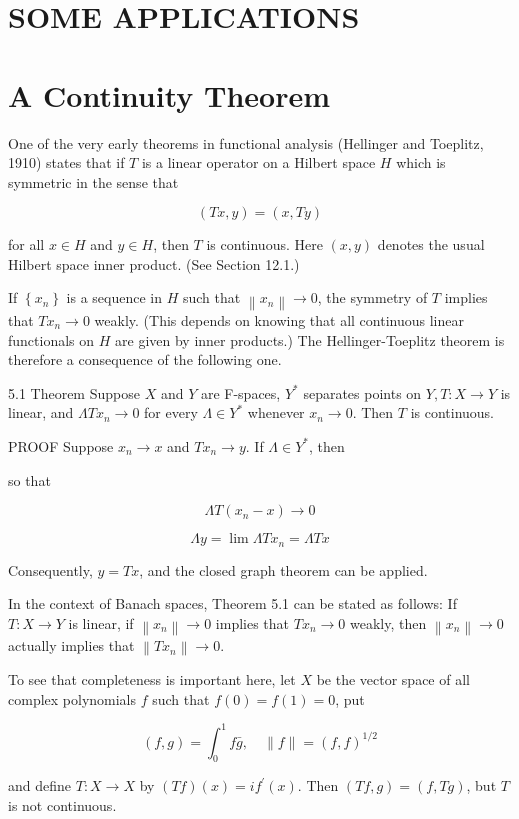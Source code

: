 \documentclass[10pt]{article}
\begin{document}
\section{SOME APPLICATIONS}
\section{A Continuity Theorem}
One of the very early theorems in functional analysis (Hellinger and Toeplitz, 1910) states that if $T$ is a linear operator on a Hilbert space $H$ which is symmetric in the sense that

$$
(T x, y)=(x, T y)
$$

for all $x \in H$ and $y \in H$, then $T$ is continuous. Here $(x, y)$ denotes the usual Hilbert space inner product. (See Section 12.1.)

If $\left\{x_{n}\right\}$ is a sequence in $H$ such that $\left\|x_{n}\right\| \rightarrow 0$, the symmetry of $T$ implies that $T x_{n} \rightarrow 0$ weakly. (This depends on knowing that all continuous linear functionals on $H$ are given by inner products.) The Hellinger-Toeplitz theorem is therefore a consequence of the following one.

5.1 Theorem Suppose $X$ and $Y$ are F-spaces, $Y^{*}$ separates points on $Y, T: X \rightarrow Y$ is linear, and $\Lambda T x_{n} \rightarrow 0$ for every $\Lambda \in Y^{*}$ whenever $x_{n} \rightarrow 0$. Then $T$ is continuous.

PROOF Suppose $x_{n} \rightarrow x$ and $T x_{n} \rightarrow y$. If $\Lambda \in Y^{*}$, then

so that

$$
\Lambda T\left(x_{n}-x\right) \rightarrow 0
$$

$$
\Lambda y=\lim \Lambda T x_{n}=\Lambda T x
$$

Consequently, $y=T x$, and the closed graph theorem can be applied.

In the context of Banach spaces, Theorem 5.1 can be stated as follows: If $T: X \rightarrow Y$ is linear, if $\left\|x_{n}\right\| \rightarrow 0$ implies that $T x_{n} \rightarrow 0$ weakly, then $\left\|x_{n}\right\| \rightarrow 0$ actually implies that $\left\|T x_{n}\right\| \rightarrow 0$.

To see that completeness is important here, let $X$ be the vector space of all complex polynomials $f$ such that $f(0)=f(1)=0$, put

$$
(f, g)=\int_{0}^{1} f \bar{g}, \quad\|f\|=(f, f)^{1 / 2}
$$

and define $T: X \rightarrow X$ by $(T f)(x)=i f^{\prime}(x)$. Then $(T f, g)=(f, T g)$, but $T$ is not continuous.
\end{document}
